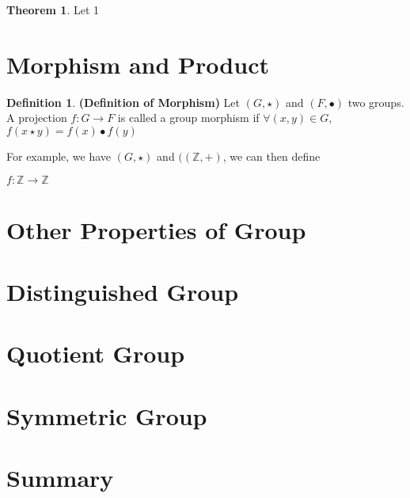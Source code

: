 \documentclass{article}
\theoremstyle{definition}
\newtheorem{defi}{Definition}[subsection]
\newtheorem{theorem}{Theorem}[subsection]
\begin{document}
\begin{theorem}
Let 1
\end{theorem}

\section{Morphism and Product}

\begin{defi}
\noindent\textbf{(Definition of Morphism)} Let $(G, \star)$ and $(F, \bullet)$ two groups. A projection $f: G \to F$ is called a group morphism if $\forall (x, y) \in G$, $f(x \star y) = f(x) \bullet f(y)$

For example, we have $(G, \star)$ and $((\mathbb{Z}, +)$, we can then define

$f: \mathbb{Z} \to \mathbb{Z}$
\end{defi}


\section{Other Properties of Group}

\section{Distinguished Group}

\section{Quotient Group}

\section{Symmetric Group}

\section{Summary}
\end{document}
